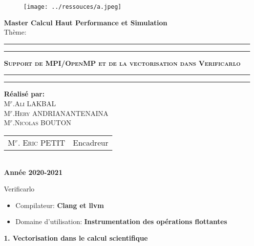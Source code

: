 \documentclass{beamer}
\begin{document}
\maketitle
\begin{center}
\begin{figure}[!htbp]
\begin{center}
\texttt{[image: ../ressouces/a.jpeg]}
\end{center}
\end{figure}


{\Large {\bf { Master Calcul Haut Performance et Simulation }}}\\
{\huge {Thème:}}\\
\hrule
\hrule
{}
{\huge \textbf{\textsc{ Support de MPI/OpenMP et de la vectorisation dans Verificarlo}}}\\
\hrule
\hrule
{}
{\textbf{\Large{Réalisé par:}}}\\
{\large\textsc{M$^{r}$.Ali LAKBAL}}\\
{\large\textsc{M$^{r}$.Hery ANDRIANANTENAINA}}\\
{\large\textsc{M$^{r}$.Nicolas BOUTON}}\\
{\large
\begin{tabular}{ll}
M$^{r}$. \textsc{Eric} PETIT  & Encadreur    \\
\end{tabular}
}\\
{\Large\textbf{ Année 2020-2021}}
\end{center}

\begin{frame}{Verificarlo}
    \begin{itemize}
        \item Compilateur: \textbf{ Clang et llvm} 
        \item Domaine d'utilisation: \textbf{ Instrumentation des opérations flottantes}
    \end{itemize}
    
\textbf{1. Vectorisation dans le calcul scientifique}
    
\end{frame}
\end{document}
